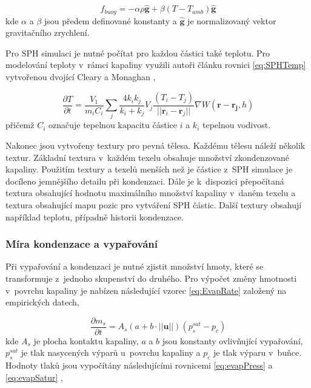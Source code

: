 \begin{equation}
\label{eq:buoyEvap}
	f_{buoy} = -\alpha \rho \hat{\mathbf{g}} + \beta(T - T_{amb})\hat{\mathbf{g}}
\end{equation}
kde $\alpha$ a $\beta$ jsou předem definované konstanty a $\hat{\mathbf{g}}$ je normalizovaný vektor gravitačního zrychlení.

Pro SPH simulaci je nutné počítat pro každou částici také teplotu. Pro modelování teploty v~rámci kapaliny využili autoři článku rovnici \ref{eq:SPHTemp} vytvořenou dvojící Cleary a Monaghan \cite{Cleary99}, 

\begin{equation}
	\frac{\partial T}{\partial t} = \frac{V_1}{m_i C_i} \sum_j \frac{4 k_i k_j}{k_i + k_j} V_j \frac{(T_i - T_j)}{||\mathbf{r}_i - \mathbf{r}_j||}\nabla W(\mathbf{r} - \mathbf{r_j},h)
	\label{eq:SPHTemp}
\end{equation}
přičemž $C_i$ označuje tepelnou kapacitu částice $i$ a $k_i$ tepelnou vodivost.

Nakonec jsou vytvořeny textury pro pevná tělesa. Každému tělesu náleží několik textur. Základní textura v~každém texelu obsahuje množství zkondenzované kapaliny. Použitím textury a texelů menších než je částice z~SPH simulace je docíleno jemnějšího detailu při kondenzaci. Dále je k~dispozici přepočítaná textura obsahující hodnotu maximálního množství kapaliny v~daném texelu a textura obsahující mapu pozic pro vytváření SPH částic. Další textury obsahují například teplotu, případně historii kondenzace.

\subsubsection{Míra kondenzace a vypařování}
Při vypařování a kondenzaci je nutné zjistit množství hmoty, které se transformuje z~jednoho skupenství do druhého. Pro výpočet změny hmotnosti v~povrchu kapaliny je nabízen následující vzorec \ref{eq:EvapRate} založený na empirických datech, \cite{SMITH94}

\begin{equation}
	\frac{\partial m_s}{\partial t} = A_s(a + b \cdot ||\mathbf{u}||)(p_s^{sat} - p_c)
	\label{eq:EvapRate}
\end{equation}
kde $A_s$ je plocha kontaktu kapaliny, $a$ a $b$ jsou konstanty ovlivňující vypařování, $p_s^{sat}$ je tlak nasycených výparů u~povrchu kapaliny a $p_c$ je tlak výparu v~buňce. Hodnoty tlaků jsou vypočítány následujícími rovnicemi \ref{eq:evapPress} a \ref{eq:evapSatur} \cite{yau1996short},

